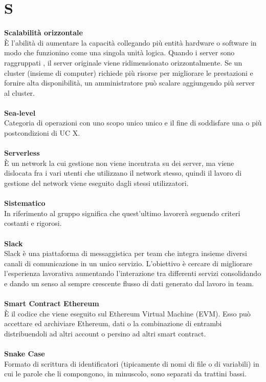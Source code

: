 \section{S}
\textbf{Scalabilità orizzontale}\\
È l'abilità di aumentare la capacità collegando più entità hardware o software in modo che funzionino come una singola unità logica. Quando i server sono raggruppati , il server originale viene ridimensionato orizzontalmente. Se un cluster (insieme di computer) richiede più risorse per migliorare le prestazioni e fornire alta disponibilità, un amministratore può scalare aggiungendo più server al cluster. \\ \\
\textbf{Sea-level}\\
Categoria di operazioni con uno scopo unico unico e il fine di soddisfare una o più postcondizioni di UC X. \\ \\
\textbf{Serverless}\\
È un network la cui gestione non viene incentrata su dei server, ma viene dislocata fra i vari utenti che utilizzano il network stesso, quindi il lavoro di gestione del network viene eseguito dagli stessi utilizzatori. \\ \\
\textbf{Sistematico}\\
In riferimento al gruppo \Gruppo{} significa che quest'ultimo lavorerà seguendo criteri costanti e rigorosi. \\ \\
\textbf{Slack}\\
Slack è una piattaforma di messaggistica per team che integra insieme diversi canali di comunicazione in un unico servizio. L’obiettivo è cercare di migliorare l’esperienza lavorativa aumentando l’interazione tra differenti servizi consolidando e dando un senso al sempre crescente flusso di dati generato dal lavoro in team. \\ \\
\textbf{Smart Contract Ethereum}\\
È il codice che viene eseguito sul Ethereum Virtual Machine (EVM). Esso può accettare ed archiviare Ethereum, dati o la combinazione di entrambi distribuendoli ad altri account o persino ad altri smart contract. \\ \\
\textbf{Snake Case}\\
Formato di scrittura di identificatori (tipicamente di nomi di file o di variabili) in cui le parole che li compongono, in minuscolo, sono separati da trattini bassi.
